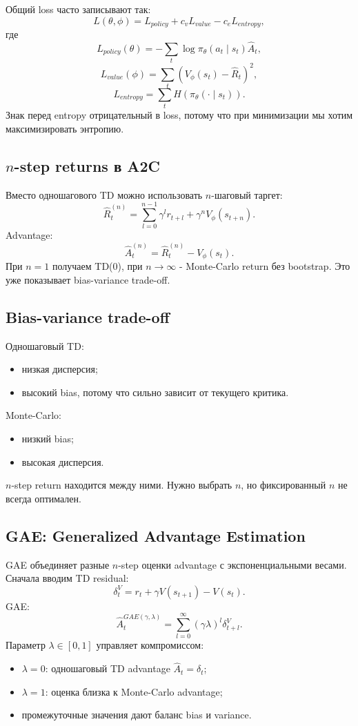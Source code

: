 \documentclass[11pt,a4paper]{article}
\newcommand{\1}{\mathbf{1}}
\begin{document}
Общий loss часто записывают так:
\[
    L(\theta,\phi)=L_{policy}+c_vL_{value}-c_eL_{entropy},
\]
где
\[
    L_{policy}(\theta)=-\sum_t \log\pi_\theta(a_t\mid s_t)\hat A_t,
\]
\[
    L_{value}(\phi)=\sum_t\left(V_\phi(s_t)-\hat R_t\right)^2,
\]
\[
    L_{entropy}=\sum_t H(\pi_\theta(\cdot\mid s_t)).
\]
Знак перед entropy отрицательный в loss, потому что при минимизации мы хотим максимизировать энтропию.

\subsection*{$n$-step returns в A2C}
Вместо одношагового TD можно использовать $n$-шаговый таргет:
\[
    \hat R_t^{(n)}=\sum_{l=0}^{n-1}\gamma^l r_{t+l}+\gamma^n V_\phi(s_{t+n}).
\]
Advantage:
\[
    \hat A_t^{(n)}=\hat R_t^{(n)}-V_\phi(s_t).
\]
При $n=1$ получаем TD(0), при $n\to\infty$ - Monte-Carlo return без bootstrap. Это уже показывает bias-variance trade-off.

\subsection*{Bias-variance trade-off}
Одношаговый TD:
\begin{itemize}
    \item низкая дисперсия;
    \item высокий bias, потому что сильно зависит от текущего критика.
\end{itemize}
Monte-Carlo:
\begin{itemize}
    \item низкий bias;
    \item высокая дисперсия.
\end{itemize}
$n$-step return находится между ними. Нужно выбрать $n$, но фиксированный $n$ не всегда оптимален.

\subsection*{GAE: Generalized Advantage Estimation}
GAE объединяет разные $n$-step оценки advantage с экспоненциальными весами. Сначала вводим TD residual:
\[
    \delta_t^V=r_t+\gamma V(s_{t+1})-V(s_t).
\]
GAE:
\[
    \hat A_t^{GAE(\gamma,\lambda)}=
    \sum_{l=0}^{\infty}(\gamma\lambda)^l\delta_{t+l}^V.
\]
Параметр $\lambda\in[0,1]$ управляет компромиссом:
\begin{itemize}
    \item $\lambda=0$: одношаговый TD advantage $\hat A_t=\delta_t$;
    \item $\lambda=1$: оценка близка к Monte-Carlo advantage;
    \item промежуточные значения дают баланс bias и variance.
\end{itemize}
\end{document}
